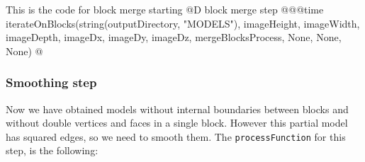 \documentclass[11pt,oneside]{article}	%
\begin{document}
This is the code for block merge starting
@D block merge step
@{@@time iterateOnBlocks(string(outputDirectory, "MODELS"),
                  imageHeight, imageWidth, imageDepth,
                  imageDx, imageDy, imageDz,
                  mergeBlocksProcess, None,
                  None, None) @}


\subsubsection{Smoothing step}\label{sec:smoothingStep}

Now we have obtained models without internal boundaries between blocks and without double vertices and faces in a single block. However this partial model has squared edges, so we need to smooth them. The \texttt{processFunction} for this step, is the following:
\end{document}
